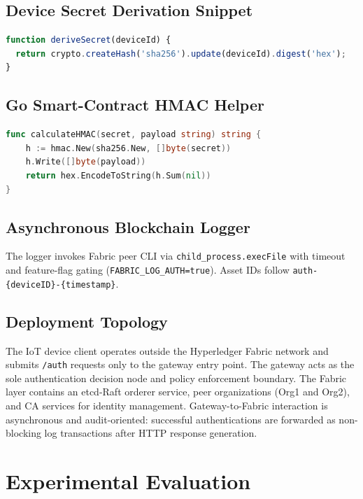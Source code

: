\documentclass[conference]{IEEEtran}
\begin{document}
\subsection{Device Secret Derivation Snippet}

\begin{lstlisting}[language=JavaScript,
caption={Device secret derivation in gateway authentication service.}]
function deriveSecret(deviceId) {
  return crypto.createHash('sha256').update(deviceId).digest('hex');
}
\end{lstlisting}

\subsection{Go Smart-Contract HMAC Helper}

\begin{lstlisting}[language=Go,
caption={HMAC helper in Go chaincode.}]
func calculateHMAC(secret, payload string) string {
    h := hmac.New(sha256.New, []byte(secret))
    h.Write([]byte(payload))
    return hex.EncodeToString(h.Sum(nil))
}
\end{lstlisting}

\subsection{Asynchronous Blockchain Logger}

The logger invokes Fabric peer CLI via \texttt{child\_process.execFile}
with timeout and feature-flag gating (\texttt{FABRIC\_LOG\_AUTH=true}).
Asset IDs follow \texttt{auth-\{deviceID\}-\{timestamp\}}.

\subsection{Deployment Topology}

The IoT device client operates outside the Hyperledger Fabric network and
submits \texttt{/auth} requests only to the gateway entry point. The gateway
acts as the sole authentication decision node and policy enforcement boundary.
The Fabric layer contains an etcd-Raft orderer service, peer organizations
(Org1 and Org2), and CA services for identity management. Gateway-to-Fabric
interaction is asynchronous and audit-oriented: successful authentications are
forwarded as non-blocking log transactions after HTTP response generation.

\section{Experimental Evaluation}
\label{sec:eval}
\end{document}
